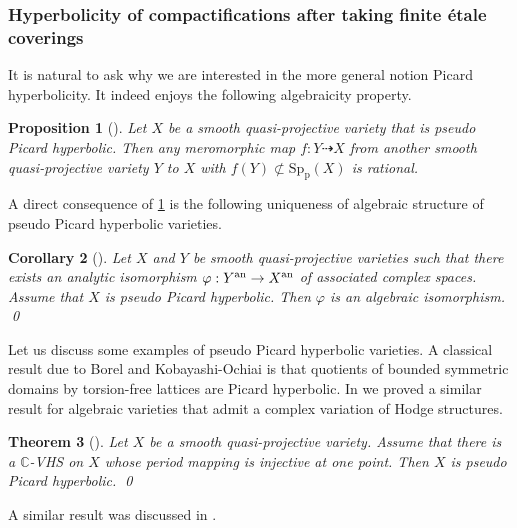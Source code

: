 \documentclass[english]{amsproc}
\theoremstyle{plain}
\newtheorem{thm}{Theorem}[section]
\newtheorem{proposition}[thm]{Proposition}
\newtheorem{cor}[thm]{Corollary}
\theoremstyle{definition}
\theoremstyle{remark}
\theoremstyle{plain}
\numberwithin{equation}{thm} %
\newcommand{\bC}{\mathbb{C}}
\begin{document}
\subsubsection{Hyperbolicity of compactifications after taking finite \'etale coverings} 
It is natural to ask why we are interested in the more general notion Picard hyperbolicity. It indeed enjoys the following algebraicity property.
\begin{proposition}[\cite{Denarxiv}] \label{extension theorem} 
	Let $X$ be a smooth quasi-projective variety that is pseudo Picard hyperbolic. Then any meromorphic map $f:Y\dashrightarrow X$ from another smooth quasi-projective variety $Y$ to $X$ with $f(Y)\not\subset \mathrm{Sp_p}(X)$ is \emph{rational}. 
\end{proposition} 
A direct consequence of \cref{extension theorem}  is the following uniqueness of algebraic structure of pseudo Picard hyperbolic varieties. 

\begin{cor}[\cite{Denarxiv}] 
	Let $X$ and $Y$ be smooth quasi-projective varieties such that there exists an analytic   isomorphism $\varphi:Y^{\rm an}\to X^{\rm an}$ of associated complex spaces.
	Assume that $X$ is pseudo Picard hyperbolic. 
	Then $\varphi$ is an algebraic isomorphism. \qed
\end{cor} 

Let us discuss some examples of pseudo Picard hyperbolic varieties. A classical result due to Borel \cite{Bor72} and Kobayashi-Ochiai \cite{KO71} is that quotients of bounded symmetric domains by torsion-free lattices are Picard hyperbolic. In \cite{Denarxiv} we  proved a similar result for algebraic varieties that admit a complex variation of Hodge structures.
\begin{thm}[{\cite[Theorem A]{Denarxiv}}]\label{thm:PicardVHS}
	Let $X$ be a smooth quasi-projective variety. Assume that there is a $\bC$-VHS on $X$ whose period mapping is injective at one  point. Then $X$ is pseudo Picard hyperbolic. \qed
\end{thm}   
A similar result was discussed in \cite{BB20}.
\end{document}
